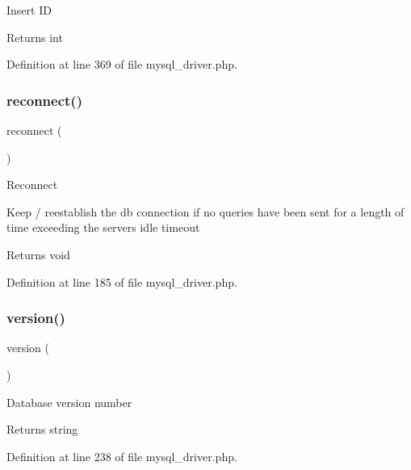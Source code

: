 Insert ID

\begin{DoxyReturn}{Returns}
int 
\end{DoxyReturn}


Definition at line 369 of file mysql\+\_\+driver.\+php.

\mbox{\label{class_c_i___d_b__mysql__driver_a57c19c642ab3023e28d10c50f86ff0a8}} 
\subsubsection{\texorpdfstring{reconnect()}{reconnect()}}
{\footnotesize\ttfamily reconnect (\begin{DoxyParamCaption}{ }\end{DoxyParamCaption})}

Reconnect

Keep / reestablish the db connection if no queries have been sent for a length of time exceeding the server\textquotesingle{}s idle timeout

\begin{DoxyReturn}{Returns}
void 
\end{DoxyReturn}


Definition at line 185 of file mysql\+\_\+driver.\+php.

\mbox{\label{class_c_i___d_b__mysql__driver_a6080dae0886626b9a4cedb29240708b1}} 
\subsubsection{\texorpdfstring{version()}{version()}}
{\footnotesize\ttfamily version (\begin{DoxyParamCaption}{ }\end{DoxyParamCaption})}

Database version number

\begin{DoxyReturn}{Returns}
string 
\end{DoxyReturn}


Definition at line 238 of file mysql\+\_\+driver.\+php.



